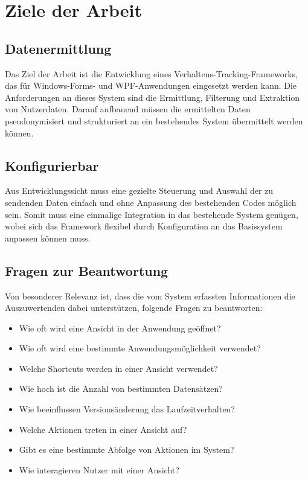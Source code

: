 \section{Ziele der Arbeit}

\subsection{Datenermittlung}
Das Ziel der Arbeit ist die Entwicklung eines Verhaltens-Tracking-Frameworks, das für Windows-Forms- und WPF-Anwendungen eingesetzt werden kann. Die Anforderungen an dieses System sind die Ermittlung, Filterung und Extraktion von Nutzerdaten. Darauf aufbauend müssen die ermittelten Daten pseudonymisiert und strukturiert an ein bestehendes System übermittelt werden können.

\subsection{Konfigurierbar}
Aus Entwicklungssicht muss eine gezielte Steuerung und Auswahl der zu sendenden Daten einfach und ohne Anpassung des bestehenden Codes möglich sein. Somit muss eine einmalige Integration in das bestehende System genügen, wobei sich das Framework flexibel durch Konfiguration an das Basissystem anpassen können muss.

\subsection{Fragen zur Beantwortung}
\label{subsec:initial_questions}
Von besonderer Relevanz ist, dass die vom System erfassten Informationen die Auszuwertenden dabei unterstützen, folgende Fragen zu beantworten:

\begin{itemize}
    \item Wie oft wird eine Ansicht in der Anwendung geöffnet?
    \item Wie oft wird eine bestimmte Anwendungsmöglichkeit verwendet?
    \item Welche Shortcuts werden in einer Ansicht verwendet?
    \item Wie hoch ist die Anzahl von bestimmten Datensätzen?
    \item Wie beeinflussen Versionsänderung das Laufzeitverhalten?
    \item Welche Aktionen treten in einer Ansicht auf?
    \item Gibt es eine bestimmte Abfolge von Aktionen im System?
    \item Wie interagieren Nutzer mit einer Ansicht?
\end{itemize}

